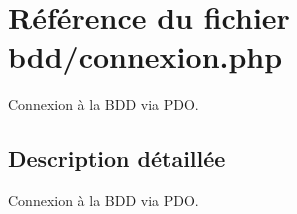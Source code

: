 \hypertarget{bdd_2connexion_8php}{}\section{Référence du fichier bdd/connexion.php}
\label{bdd_2connexion_8php}


Connexion à la B\+DD via P\+DO.  




\subsection{Description détaillée}
Connexion à la B\+DD via P\+DO. 

